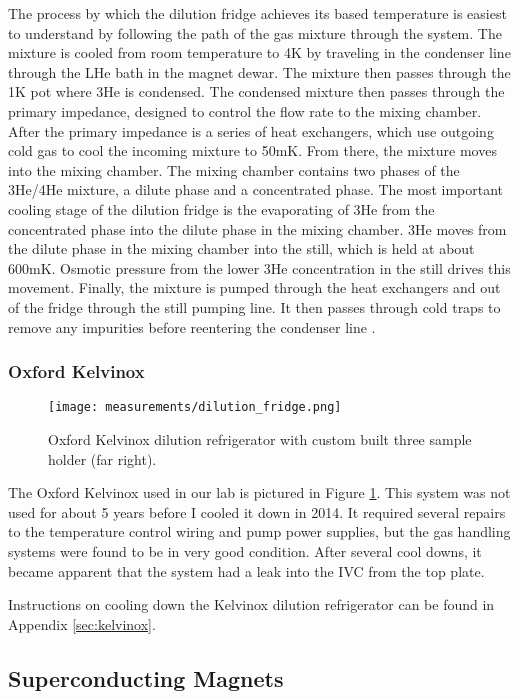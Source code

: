 The process by which the dilution fridge achieves its based temperature is easiest to understand by following the path of the gas mixture through the system. The mixture is cooled from room temperature to 4K by traveling in the condenser line through the LHe bath in the magnet dewar. The mixture then passes through the 1K pot where 3He is condensed. The condensed mixture then passes through the primary impedance, designed to control the flow rate to the mixing chamber. After the primary impedance is a series of heat exchangers, which use outgoing cold gas to cool the incoming mixture to 50mK. From there, the mixture moves into the mixing chamber. The mixing chamber contains two phases of the 3He/4He mixture, a dilute phase and a concentrated phase. The most important cooling stage of the dilution fridge is the evaporating of 3He from the concentrated phase into the dilute phase in the mixing chamber. 3He moves from the dilute phase in the mixing chamber into the still, which is held at about 600mK. Osmotic pressure from the lower 3He concentration in the still drives this movement. Finally, the mixture is pumped through the heat exchangers and out of the fridge through the still pumping line. It then passes through cold traps to remove any impurities before reentering the condenser line \cite{Balshaw2001}.

\subsubsection*{Oxford Kelvinox}

\begin{figure}
    \centering
    \texttt{[image: measurements/dilution\_fridge.png]}
    \caption{Oxford Kelvinox dilution refrigerator with custom built three sample holder (far right).}
    \label{fig:kelvinox}
\end{figure}

The Oxford Kelvinox used in our lab is pictured in Figure \ref{fig:kelvinox}. This system was not used for about 5 years before I cooled it down in 2014. It required several repairs to the temperature control wiring and pump power supplies, but the gas handling systems were found to be in very good condition. After several cool downs, it became apparent that the system had a leak into the IVC from the top plate. 

Instructions on cooling down the Kelvinox dilution refrigerator can be found in Appendix \ref{sec:kelvinox}.

\subsection{Superconducting Magnets}

